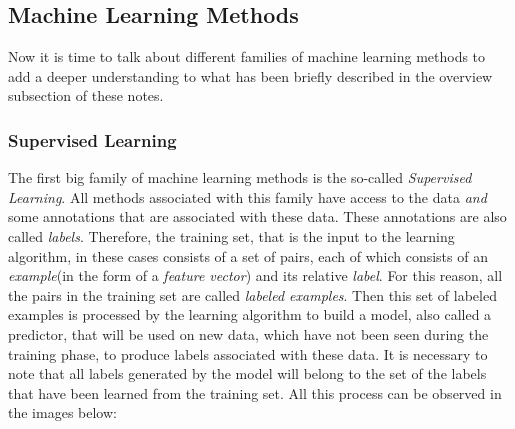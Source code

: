 \subsection{Machine Learning Methods}

Now it is time to talk about different families of machine learning
methods to add a deeper understanding to what has been briefly
described in the overview subsection of these notes.

\subsubsection{Supervised Learning}

The first big family of machine learning methods is the so-called
\emph{Supervised Learning}. All methods associated with this family
have access to the data \emph{and} some annotations that are
associated with these data. These annotations are also called
\emph{labels}. Therefore, the training set, that is the input to the
learning algorithm, in these cases consists of a set of pairs, each of
which consists of an \emph{example}(in the form of a
\emph{feature vector}) and its relative \emph{label}. For this reason,
all the pairs in the training set are called \emph{labeled examples}.
Then this set of labeled examples is processed by the learning
algorithm to build a model, also called a predictor, that will be used
on new data, which have not been seen during the training phase, to
produce labels associated with these data. It is necessary to note that
all labels generated by the model will belong to the set of the
labels that have been learned from the training set. All this process
can be observed in the images below:

\newpage

